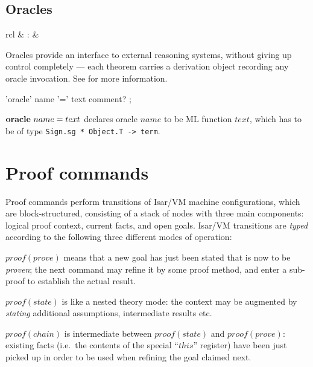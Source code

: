 \subsection{Oracles}

\begin{matharray}{rcl}
   & : &  \\
\end{matharray}

Oracles provide an interface to external reasoning systems, without giving up
control completely --- each theorem carries a derivation object recording any
oracle invocation.  See \cite[\S6]{isabelle-ref} for more information.

\begin{rail}
  'oracle' name '=' text comment?
  ;
\end{rail}

\begin{descr}
\item [${\mathord{\mathbf{oracle}}}~name=text$] declares oracle $name$ to be ML
  function $text$, which has to be of type
  \texttt{Sign.sg~*~Object.T~->~term}.
\end{descr}


\section{Proof commands}

Proof commands perform transitions of Isar/VM machine configurations, which
are block-structured, consisting of a stack of nodes with three main
components: logical proof context, current facts, and open goals.  Isar/VM
transitions are \emph{typed} according to the following three different modes
of operation:
\begin{descr}
\item [$proof(prove)$] means that a new goal has just been stated that is now
  to be \emph{proven}; the next command may refine it by some proof method,
  and enter a sub-proof to establish the actual result.
\item [$proof(state)$] is like a nested theory mode: the context may be
  augmented by \emph{stating} additional assumptions, intermediate results
  etc.
\item [$proof(chain)$] is intermediate between $proof(state)$ and
  $proof(prove)$: existing facts (i.e.\ the contents of the special ``$this$''
  register) have been just picked up in order to be used when refining the
  goal claimed next.
\end{descr}


